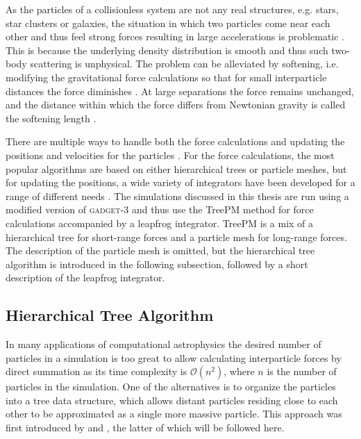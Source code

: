 \documentclass[english, oneside]{HYgradu}
\begin{document}
As the particles of a collisionless system are not any real structures, e.g. stars, star clusters or galaxies, the situation in which two particles come near each other and thus feel strong forces resulting in large accelerations is problematic \citep{binney2008galactic}. This is because the underlying density distribution is smooth and thus such two-body scattering is unphysical. The problem can be alleviated by softening, i.e. modifying the gravitational force calculations so that for small interparticle distances the force diminishes \citep{binney2008galactic}. At large separations the force remains unchanged, and the distance within which the force differs from Newtonian gravity is called the softening length \citep{binney2008galactic}.

There are multiple ways to handle both the force calculations and updating the positions and velocities for the particles \citep{binney2008galactic}. For the force calculations, the most popular algorithms are based on either hierarchical trees or particle meshes, but for updating the positions, a wide variety of integrators have been developed for a range of different needs \citep{binney2008galactic}. The simulations discussed in this thesis are run using a modified version of \textsc{gadget-3} and thus use the TreePM method for force calculations accompanied by a leapfrog integrator. TreePM is a mix of a hierarchical tree for short-range forces and a particle mesh for long-range forces. The description of the particle mesh is omitted, but the \citet{barnes1986hierarchical} hierarchical tree algorithm is introduced in the following subsection, followed by a short description of the leapfrog integrator.

\subsection{Hierarchical Tree Algorithm} \label{sect:tree}
In many applications of computational astrophysics the desired number of particles in a simulation is too great to allow calculating interparticle forces by direct summation as its time complexity is $\mathcal{O}(n^2)$, where $n$ is the number of particles in the simulation. One of the alternatives is to organize the particles into a tree data structure, which allows distant particles residing close to each other to be approximated as a single more massive particle. This approach was first introduced by \citet{appel1985efficient} and \citet{barnes1986hierarchical}, the latter of which will be followed here.
\end{document}
